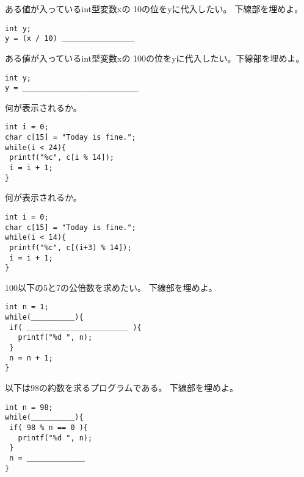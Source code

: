 \documentclass[12pt,a4j]{jarticle}
\newcounter{toi}
\def\toi{%
\bigskip\bigskip\noindent
\addtocounter{toi}{1}
\shadowbox{\bfseries\large 問\thetoi}
\nopagebreak[4]\bigskip\nopagebreak[4]
}
\begin{document}
\begin{multicols*}{2}


\toi


ある値が入っている{\ttfamily int}型変数{\ttfamily x}の
10の位を{\ttfamily y}に代入したい。
下線部を埋めよ。
\begin{verbatim}
int y;
y = (x / 10) ＿＿＿＿＿＿＿＿＿＿
\end{verbatim}



\toi

ある値が入っている{\ttfamily int}型変数{\ttfamily x}の
100の位を{\ttfamily y}に代入したい。下線部を埋めよ。
\begin{verbatim}
int y;
y = ＿＿＿＿＿＿＿＿＿＿＿＿＿＿＿＿
\end{verbatim}






\toi

何が表示されるか。
\begin{verbatim}
int i = 0;
char c[15] = "Today is fine.";
while(i < 24){
 printf("%c", c[i % 14]);
 i = i + 1;
}
\end{verbatim}



\toi

何が表示されるか。
\begin{verbatim}
int i = 0;
char c[15] = "Today is fine.";
while(i < 14){
 printf("%c", c[(i+3) % 14]);
 i = i + 1;
}
\end{verbatim}




 \toi


100以下の5と7の公倍数を求めたい。
下線部を埋めよ。
\begin{verbatim}
int n = 1;
while(＿＿＿＿＿＿){
 if( ＿＿＿＿＿＿＿＿＿＿＿＿＿＿ ){
   printf("%d ", n);
 }
 n = n + 1;
}
\end{verbatim}




\toi

以下は98の約数を求るプログラムである。
下線部を埋めよ。
\begin{verbatim}
int n = 98;
while(＿＿＿＿＿＿){
 if( 98 % n == 0 ){
   printf("%d ", n);
 }
 n = ＿＿＿＿＿＿＿＿
}
\end{verbatim}


\end{multicols*}
\end{document}
